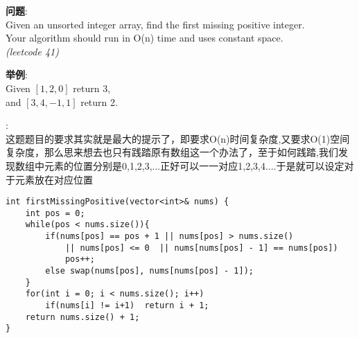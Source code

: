     
\begin{description}
    \item{\textbf{问题}}:\\
Given an unsorted integer array, find the first missing positive integer. \\
Your algorithm should run in O(n) time and uses constant space. \\
\textit{(leetcode 41)}
    \item{\textbf{举例}}:\\
Given $[1,2,0]$ return 3, \\
and $[3,4,-1,1]$ return 2.
    \item{\textbf{}} : 
    \\这题题目的要求其实就是最大的提示了，即要求O(n)时间复杂度,又要求O(1)空间复杂度，那么思来想去也只有践踏原有数组这一个办法了，至于如何践踏,我们发现数组中元素的位置分别是0,1,2,3,...正好可以一一对应1,2,3,4....于是就可以设定对于元素放在对应位置
    \begin{lstlisting}
int firstMissingPositive(vector<int>& nums) {
	int pos = 0;
	while(pos < nums.size()){
		if(nums[pos] == pos + 1 || nums[pos] > nums.size() 
			|| nums[pos] <= 0  || nums[nums[pos] - 1] == nums[pos])
			pos++;
		else swap(nums[pos], nums[nums[pos] - 1]);
	}
	for(int i = 0; i < nums.size(); i++)
		if(nums[i] != i+1)	return i + 1;
	return nums.size() + 1;
}
    \end{lstlisting}
\end{description}
